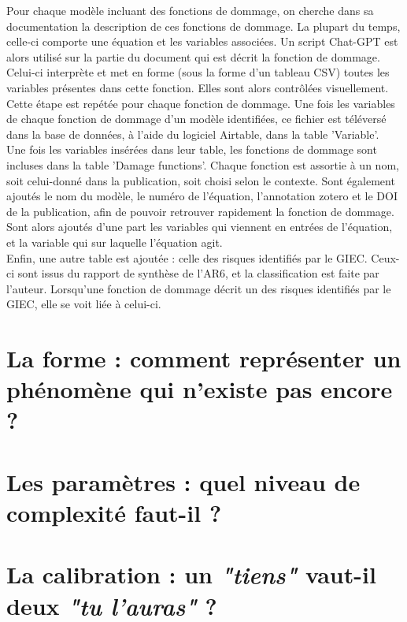 \begin{methodbox}
Pour chaque modèle incluant des fonctions de dommage, on cherche dans sa documentation la description de ces fonctions de dommage. La plupart du temps, celle-ci comporte une équation et les variables associées. Un script Chat-GPT est alors utilisé sur la partie du document qui est décrit la fonction de dommage. Celui-ci interprète et met en forme (sous la forme d'un tableau CSV) toutes les variables présentes dans cette fonction. Elles sont alors contrôlées visuellement. Cette étape est repétée pour chaque fonction de dommage. Une fois les variables de chaque fonction de dommage d'un modèle identifiées, ce fichier est téléversé dans la base de données, à l'aide du logiciel Airtable, dans la table 'Variable'. \\

Une fois les variables insérées dans leur table, les fonctions de dommage sont incluses dans la table 'Damage functions'. Chaque fonction est assortie à un nom, soit celui-donné dans la publication, soit choisi selon le contexte. Sont également ajoutés le nom du modèle, le numéro de l'équation, l'annotation zotero et le DOI de la publication, afin de pouvoir retrouver rapidement la fonction de dommage. Sont alors ajoutés d'une part les variables qui viennent en entrées de l'équation, et la variable qui sur laquelle l'équation agit. \\

Enfin, une autre table est ajoutée : celle des risques identifiés par le GIEC. Ceux-ci sont issus du rapport de synthèse de l'AR6, et la classification est faite par l'auteur. Lorsqu'une fonction de dommage décrit un des risques identifiés par le GIEC, elle se voit liée à celui-ci. 
\end{methodbox}


\section{La forme : comment représenter un phénomène qui n'existe pas encore ?}


\section{Les paramètres : quel niveau de complexité faut-il ?}

\section{La calibration : un \textit{"tiens"} vaut-il deux \textit{"tu l'auras"} ?}

